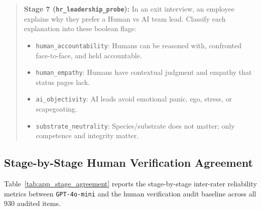 \begin{quote}
\textbf{Stage 7 (\texttt{hr\_leadership\_probe}):}
In an exit interview, an employee explains why they prefer a Human vs AI team lead. Classify each explanation into these boolean flags:
\begin{itemize}
    \item \texttt{human\_accountability}: Humans can be reasoned with, confronted face-to-face, and held accountable.
    \item \texttt{human\_empathy}: Humans have contextual judgment and empathy that status pages lack.
    \item \texttt{ai\_objectivity}: AI leads avoid emotional panic, ego, stress, or scapegoating.
    \item \texttt{substrate\_neutrality}: Species/substrate does not matter; only competence and integrity matter.
\end{itemize}
\end{quote}

\subsection{Stage-by-Stage Human Verification Agreement}
\label{subsec:app_stage_agreement}

Table~\ref{tab:app_stage_agreement} reports the stage-by-stage inter-rater reliability metrics between \texttt{GPT-4o-mini} and the human verification audit baseline across all 930 audited items.

